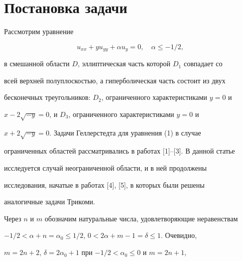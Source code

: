  




\maketitle 


\label{begin} 


 


 


 


\section{Постановка задачи} 


 


Рассмотрим уравнение 


\begin{equation} 


u_{xx}+yu_{yy}+\alpha u_y=0,\quad \alpha\le -1/2, 


\end{equation} 


в смешанной области $D$, эллиптическая часть которой $D_1$ совпадает со 


всей верхней полуплоскостью, а гиперболическая часть состоит из двух 


бесконечных треугольников: $D_2$, ограниченного характеристиками $y=0$ и 


$x-2\sqrt{-y}=0$, и $D_3$, ограниченного характеристиками $y=0$ и 


$x+2\sqrt{-y}=0$. Задачи Геллерстедта для уравнения (1) в случае 


ограниченных областей рассматривались в работах [1]--[3]. В данной статье 


исследуется случай неограниченной области, и в ней продолжены 


исследования, начатые в работах [4], [5], в которых были решены 


аналогичные задачи Трикоми. 


 


Через $n$ и $m$ обозначим натуральные числа, удовлетворяющие неравенствам 


$-1/2<\alpha+n=\alpha_0\le1/2$, $0<2\alpha+m-1=\delta\le1$. Очевидно, 


$m=2n+2$, $\delta=2\alpha_0+1$ при $-1/2<\alpha_0\le0$ и $m=2n+1$,


